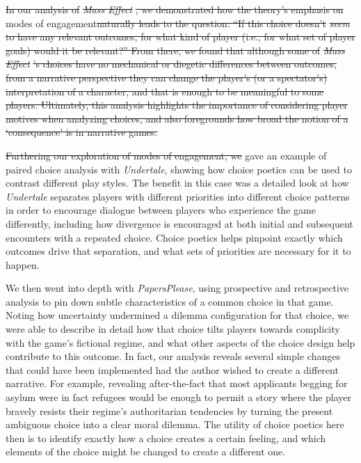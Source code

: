 \documentclass[arts,article,submit,moreauthors,pdftex,10pt,a4paper]{Definitions/mdpi}
\providecommand{\DIFadd}[1]{{\protect\color{blue}\uwave{#1}}} %
\providecommand{\DIFdel}[1]{{\protect\color{red}\sout{#1}}}                      %
\providecommand{\DIFaddbegin}{} %
\providecommand{\DIFaddend}{} %
\providecommand{\DIFdelbegin}{} %
\providecommand{\DIFdelend}{} %
\begin{document}
\DIFdelbegin \DIFdel{In our analysis of }\emph{\DIFdel{Mass Effect}}%
\DIFdel{, we demonstrated how the theory's emphasis on }\DIFdelend \DIFaddbegin \DIFadd{To explore }\DIFaddend modes of engagement\DIFdelbegin \DIFdel{naturally leads to the question: ``If this choice doesn't }\emph{\DIFdel{seem}} %
\DIFdel{to have any relevant outcomes, for what kind of player (i.e., for what set of player goals) would it be relevant?''
From there, we found that although some of }\emph{\DIFdel{Mass Effect}}%
\DIFdel{'s choices have no mechanical or diegetic differences between outcomes, from a narrative perspective they can change the player's (or a spectator's) interpretation of a character, and that is enough to be meaningful to some players.
Ultimately, this analysis highlights the importance of considering player motives when analyzing choices, and also foregrounds how broad the notion of a `consequence' is in narrative games.
}%

\DIFdel{Furthering our exploration of modes of engagement, we }\DIFdelend \DIFaddbegin \DIFadd{, we }\DIFaddend gave an example of paired choice analysis with \DIFaddbegin \DIFadd{a central and recurring choice from }\DIFaddend \emph{Undertale}, showing how choice poetics can be used to contrast different play styles.
%
The benefit in this case was a detailed look at how \emph{Undertale} separates players with different priorities into different choice patterns in order to encourage dialogue between players who experience the game differently, including how divergence is encouraged at both initial and subsequent encounters with a repeated choice.
%
Choice poetics helps pinpoint exactly which outcomes drive that separation, and what sets of priorities are necessary for it to happen.


We then went into depth with \emph{Papers\DIFaddbegin \DIFadd{, }\DIFaddend Please}, using prospective and retrospective analysis to pin down subtle characteristics of a common choice in that game.
%
Noting how uncertainty undermined a dilemma configuration for that choice, we were able to describe in detail how that choice tilts players towards complicity with the game's fictional regime, and what other aspects of the choice design help contribute to this outcome.
%
In fact, our analysis reveals several simple changes that could have been implemented had the author wished to create a different narrative.
%
For example, revealing after-the-fact that most applicants begging for asylum were in fact refugees would be enough to permit a story where the player bravely resists their regime's authoritarian tendencies by turning the present ambiguous choice into a clear moral dilemma.
%
The utility of choice poetics here then is to identify exactly how a choice creates a certain feeling, and which elements of the choice might be changed to create a different one.
\end{document}
